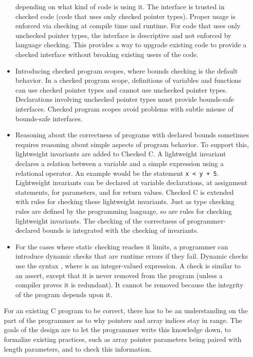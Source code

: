 \begin{itemize}
  depending on what kind of code is using it. The
  interface is trusted in checked code (code that uses only checked pointer types).
  Proper usage is enforced via checking at compile time and runtime. For
  code that uses only unchecked pointer types, the interface is descriptive and
  not enforced by
  language checking. This provides a way to upgrade existing code to
  provide a checked interface without breaking existing users of the code.
\item
  Introducing checked program scopes, where bounds checking is the
  default behavior. In a checked program scope, definitions of variables
  and functions can use checked pointer types and cannot use unchecked pointer
  types. Declarations involving unchecked pointer types must provide
  bounds-safe interfaces. Checked program scopes avoid problems with
  subtle misuse of bounds-safe interfaces.
\item
  Reasoning about the correctness of programs with declared bounds
  sometimes requires reasoning about simple aspects of program behavior.
  To support this, lightweight invariants are added to Checked C. A lightweight
  invariant declares a relation between a variable and a simple
  expression using a relational operator. An example would be the
  statement \texttt{x < y + 5}. Lightweight invariants can be
  declared at variable declarations, at assignment statements, for
  parameters, and for return values. Checked C is extended with rules for
  checking these lightweight invariants. Just as type checking rules are
  defined by the programming language, so are rules for checking
  lightweight invariants. The checking of the correctness of
  programmer-declared bounds is integrated with the checking of
  invariants.
\item
  For the cases where static checking reaches it limits, a programmer
  can introduce dynamic checks that are runtime errors if they fail.
  Dynamic checks use the syntax  , where  is an
  integer-valued expression. A check is similar to an assert, except
  that it is never removed from the program (unless a compiler proves
  it is redundant). It cannot be removed because the integrity of the
  program depends upon it.
\end{itemize}

For an existing C program to be correct, there has to be an
understanding on the part of the programmer as to why pointers and array
indices stay in range. The goals of the design are to let the programmer
write this knowledge down, to formalize existing practices, such as
array pointer parameters being paired with length parameters, and to
check this information.

